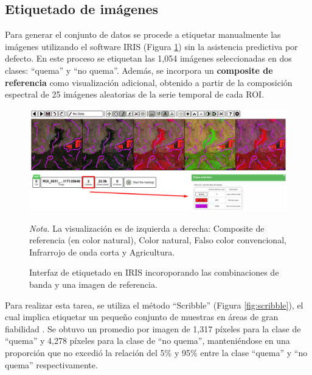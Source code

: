 \subsection{Etiquetado de imágenes}
\label{sec:etiquetado}
Para generar el conjunto de datos se procede a etiquetar manualmente las imágenes utilizando el software IRIS (Figura \ref{fig:iris}) sin la asistencia predictiva por defecto. En este proceso se etiquetan 
las 1,054 imágenes seleccionadas en dos clases: ``quema'' y ``no quema''. Además, se incorpora un \textbf{composite de referencia} como visualización adicional, obtenido a partir de la composición espectral de 25 
imágenes aleatorias de la serie temporal de cada ROI. 

\begin{figure}[H]
    \centering
    \caption{Interfaz de etiquetado en IRIS incoroporando las combinaciones de banda y una imagen de referencia.}
    \includegraphics[width=1\textwidth]{img/6_metodologia/iris.png}
    \label{fig:iris}
    \begin{flushleft}
        \vspace{-\baselineskip}
        \textit{Nota.} La visualización es de izquierda a derecha: Composite de referencia (en color natural), Color natural, Falso color convencional, Infrarrojo de onda corta y Agricultura.       
    \end{flushleft}    
\end{figure}

Para realizar esta tarea, se utiliza el método ``Scribble'' (Figura \ref{fig:scribble}), el cual implica etiquetar un pequeño conjunto de muestras en áreas de gran fiabilidad \citep{luo_coarse--fine_2018}. Se obtuvo un 
promedio por imagen de 1,317 píxeles para la clase de ``quema'' y 4,278 píxeles para la clase de ``no quema'', manteniéndose en una proporción que no excedió 
la relación del 5\% y 95\% entre la clase ``quema'' y ``no quema'' respectivamente.

